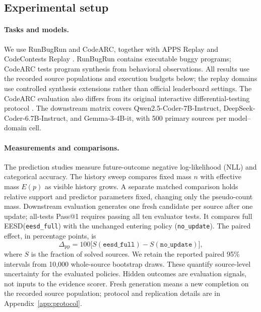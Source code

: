 \documentclass{article}
\newcommand{\method}{\textsc{EESD}\xspace}
\begin{document}
\subsection{Experimental setup}

\paragraph{Tasks and models.}
We use RunBugRun and CodeARC, together with APPS Replay and CodeContests Replay \citep{runbugrun,codearc}. RunBugRun contains executable buggy programs; CodeARC tests program synthesis from behavioral observations. All results use the recorded source populations and execution budgets below; the replay domains use controlled synthesis extensions rather than official leaderboard settings. The CodeARC evaluation also differs from its original interactive differential-testing protocol \citep{codearc}. The downstream matrix covers Qwen2.5-Coder-7B-Instruct, DeepSeek-Coder-6.7B-Instruct, and Gemma-3-4B-it, with 500 primary sources per model--domain cell.

\paragraph{Measurements and comparisons.}
The prediction studies measure future-outcome negative log-likelihood (NLL) and categorical accuracy. The history sweep compares fixed mass $n$ with effective mass $E(p)$ as visible history grows. A separate matched comparison holds relative support and predictor parameters fixed, changing only the pseudo-count mass. Downstream evaluation generates one fresh candidate per source after one update; all-tests Pass@1 requires passing all ten evaluator tests. It compares full \method (\texttt{eesd\_full}) with the unchanged entering policy (\texttt{no\_update}). The paired effect, in percentage points, is
\begin{equation}
\Delta_{\mathrm{pp}}=100\bigl[S(\texttt{eesd\_full})-S(\texttt{no\_update})\bigr],
\label{eq:downstream-delta}
\end{equation}
where $S$ is the fraction of solved sources. We retain the reported paired 95\% intervals from 10,000 whole-source bootstrap draws. These quantify source-level uncertainty for the evaluated policies. Hidden outcomes are evaluation signals, not inputs to the evidence scorer. Fresh generation means a new completion on the recorded source population; protocol and replication details are in Appendix~\ref{app:protocol}.
\end{document}
